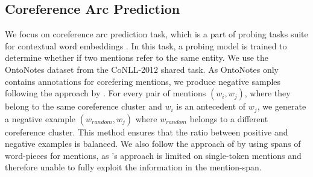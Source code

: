 \documentclass[11pt]{article}
\begin{document}
\subsection{Coreference Arc Prediction}



We focus on coreference arc prediction task, which is a part of probing tasks suite for contextual word embeddings \parencite{liu2019linguistic, tenney2019context}. In this task, a probing model is trained to determine whether if two mentions refer to the same entity. We use the OntoNotes dataset \parencite{conll} from the CoNLL-2012 shared task. As OntoNotes only contains annotations for corefering mentions, we produce negative samples following the approach by \parencite{liu2019linguistic}. For every pair of mentions $(w_{i}, w_{j})$, where they belong to the same coreference cluster and $w_{i}$ is an antecedent of $w_{j}$, we generate a negative example $(w_{random}, w_{j})$ where $w_{random}$ belongs to a different coreference cluster. This method ensures that the ratio between positive and negative examples is balanced. We also follow the approach of \parencite{tenney2019context} by using spans of word-pieces for mentions, as \parencite{liu2019linguistic}'s approach is limited on single-token mentions and therefore unable to fully exploit the information in the mention-span.
\end{document}
